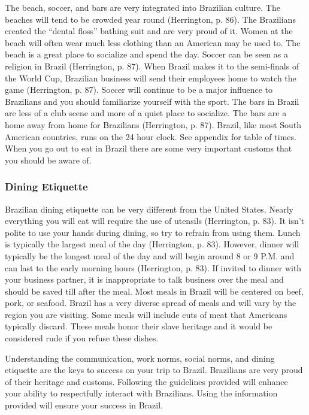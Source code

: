 \documentclass[11pt,a4paper,oneside]{report}
\begin{document}
The beach, soccer, and bars are very integrated into Brazilian culture. The
beaches will tend to be crowded year round (Herrington, p. 86). The Brazilians
created the “dental floss” bathing suit and are very proud of it. Women at the
beach will often wear much less clothing than an American may be used to. The
beach is a great place to socialize and spend the day.  Soccer can be seen as a
religion in Brazil (Herrington, p. 87). When Brazil makes it to the semi-finals
of the World Cup, Brazilian business will send their employees home to watch
the game (Herrington, p. 87). Soccer will continue to be a major influence to
Brazilians and you should familiarize yourself with the sport. The bars in
Brazil are less of a club scene and more of a quiet place to socialize. The
bars are a home away from home for Brazilians (Herrington, p. 87). Brazil, like
most South American countries, runs on the 24 hour clock. See appendix for
table of times.  When you go out to eat in Brazil there are some very important
customs that you should be aware of.

\subsubsection{Dining Etiquette}
Brazilian dining etiquette can be very different from the United States.
Nearly everything you will eat will require the use of utensils
(Herrington, p. 83). It isn’t polite to use your hands during dining, so
try to refrain from using them. Lunch is typically the largest meal of the
day (Herrington, p. 83). However, dinner will typically be the longest meal
of the day and will begin around 8 or 9 P.M. and can last to the early
morning hours (Herrington, p. 83). If invited to dinner with your business
partner, it is inappropriate to talk business over the meal and should be
saved till after the meal. Most meals in Brazil will be centered on beef,
pork, or seafood. Brazil has a very diverse spread of meals and will vary
by the region you are visiting. Some meals will include cuts of meat that
Americans typically discard. These meals honor their slave heritage and it
would be considered rude if you refuse these dishes.

Understanding the communication, work norms, social norms, and dining etiquette
are the keys to success on your trip to Brazil. Brazilians are very proud of
their heritage and customs. Following the guidelines provided will enhance your
ability to respectfully interact with Brazilians. Using the information
provided will ensure your success in Brazil.
\end{document}
